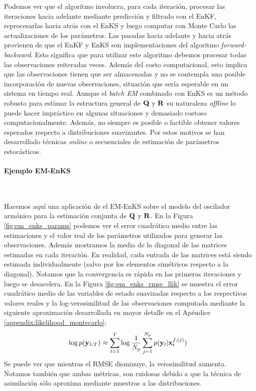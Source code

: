 Podemos ver que el algoritmo involucra, para cada iteración, procesar las iteraciones hacia adelante mediante predicción y filtrado con el EnKF, reprocesarlas hacia atrás con el EnKS y luego computar con Monte Carlo las actualizaciones de los parámetros. Las pasadas hacia adelante y hacia atrás provienen de que el EnKF y EnKS son implementaciones del algoritmo \textit{forward-backward}. Esto significa que para utilizar este algoritmo debemos procesar todas las observaciones reiteradas veces. Además del costo computacional, esto implica que las observaciones tienen que ser almacenadas y no se contempla una posible incorporación de nuevas observaciones, situación que sería esperable en un sistema en tiempo real. Aunque el \textit{batch EM} combinado con EnKS es un método robusto para estimar la estructura general de $\mathbf{Q}$ y $\mathbf{R}$ su naturaleza \textit{offline} lo puede hacer impráctico en algunas situaciones y demasiado costoso computacionalmente. Además, no siempre es posible o factible obtener valores esperados respecto a distribuciones suavizantes. Por estos motivos se han desarrollado técnicas \textit{online} o secuenciales de estimación de parámetros estocásticos. 

\paragraph{Ejemplo EM-EnKS} \

Hacemos aquí una aplicación de el EM-EnKS sobre el modelo del oscilador armónico para la estimación conjunta de $\mathbf{Q}$ y $\mathbf{R}$. En la Figura \ref{fig:em_enks_params} podemos ver el error cuadrático medio entre las estimaciones y el valor real de los parámetros utilizados para generar las observaciones. Además mostramos la media de la diagonal de las matrices estimadas en cada iteración. En realidad, cada entrada de las matrices está siendo estimada individualmente (salvo por los elementos simétricos respecto a la diagonal). Notamos que la convergencia es rápida en las primeras iteraciones y luego se desacelera. En la Figura \ref{fig:em_enks_rmse_llik} se muestra el error cuadrático medio de las variables de estado suavizadas respecto a los respectivos valores reales y la log-verosimilitud de las observaciones computada mediante la siguiente aproximación desarrollada en mayor detalle en el Apéndice \ref{appendix:likelihood_montecarlo}:
\begin{align}
    \log p(\mathbf{y}_{1:T}) \approx \sum_{t=1}^{T} \log \frac{1}{N_p} \sum_{j=1}^{N_p} p(\mathbf{y}_t | \mathbf{x}_t^{f, (j)}) \label{eq:likelihood_montecarlo}
\end{align}
Se puede ver que mientras el RMSE disminuye, la verosimilitud aumenta. Notamos también que ambas métricas, son ruidosas debido a que la técnica de asimilación sólo aproxima mediante muestras a las distribuciones.

